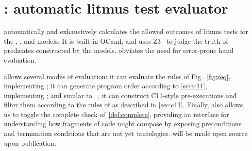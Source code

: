 \section{\PwTerTITLE: automatic litmus test evaluator}
\label{sec:tool}

\PwTer{} automatically and exhaustively calculates the allowed outcomes of litmus tests for the \PwT, \PwTpo, and \PwTc{} models. It is built in OCaml, and uses Z3~\cite{Z3Solver} to judge the truth of predicates constructed by the models. \PwTer{} obviates the need for error-prone hand evaluation.

\PwTer{} allows several modes of evaluation: it can evaluate the rules of Fig.~\ref{fig:seq}, implementing \PwT; it can generate program order according to \textsection\ref{sec:c11}, implementing \PwTpo; and similar to \MRD~\cite{DBLP:conf/esop/PaviottiCPWOB20}, it can construct C11-style pre-executions and filter them according to the rules of \rcXI{} as described in \textsection\ref{sec:c11}.
Finally, \PwTer{} also allows us to toggle the complete check of~\ref{def:complete}, providing an interface for understanding how fragments of code might compose by exposing preconditions and termination conditions that are not yet tautologies.
\PwTer{} will be made open source upon publication.

